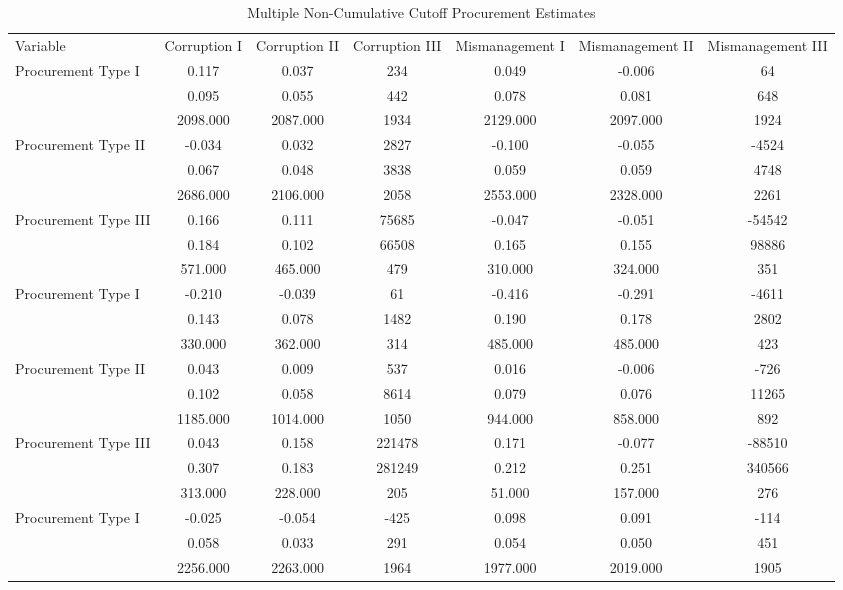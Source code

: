 \begin{table}[!htbp]
\centering
\caption{Multiple Non-Cumulative Cutoff Procurement Estimates} 
\label{tab:rdmc}
\begingroup\scriptsize
\begin{tabular}{lcccccc}
  \hline
\hline
Variable & Corruption I & Corruption II & Corruption III & Mismanagement I & Mismanagement II & Mismanagement III \\ 
 Procurement Type I & 0.117 & 0.037 & 234 & 0.049 & -0.006 & 64 \\ 
    & 0.095 & 0.055 & 442 & 0.078 & 0.081 & 648 \\ 
    & 2098.000 & 2087.000 & 1934 & 2129.000 & 2097.000 & 1924 \\ 
  Procurement Type II & -0.034 & 0.032 & 2827 & -0.100 & -0.055 & -4524 \\ 
    & 0.067 & 0.048 & 3838 & 0.059 & 0.059 & 4748 \\ 
    & 2686.000 & 2106.000 & 2058 & 2553.000 & 2328.000 & 2261 \\ 
  Procurement Type III & 0.166 & 0.111 & 75685 & -0.047 & -0.051 & -54542 \\ 
    & 0.184 & 0.102 & 66508 & 0.165 & 0.155 & 98886 \\ 
    & 571.000 & 465.000 & 479 & 310.000 & 324.000 & 351 \\ 
   \hline
Procurement Type I & -0.210 & -0.039 & 61 & -0.416 & -0.291 & -4611 \\ 
    & 0.143 & 0.078 & 1482 & 0.190 & 0.178 & 2802 \\ 
    & 330.000 & 362.000 & 314 & 485.000 & 485.000 & 423 \\ 
  Procurement Type II & 0.043 & 0.009 & 537 & 0.016 & -0.006 & -726 \\ 
    & 0.102 & 0.058 & 8614 & 0.079 & 0.076 & 11265 \\ 
    & 1185.000 & 1014.000 & 1050 & 944.000 & 858.000 & 892 \\ 
  Procurement Type III & 0.043 & 0.158 & 221478 & 0.171 & -0.077 & -88510 \\ 
    & 0.307 & 0.183 & 281249 & 0.212 & 0.251 & 340566 \\ 
    & 313.000 & 228.000 & 205 & 51.000 & 157.000 & 276 \\ 
   \hline
Procurement Type I & -0.025 & -0.054 & -425 & 0.098 & 0.091 & -114 \\ 
    & 0.058 & 0.033 & 291 & 0.054 & 0.050 & 451 \\ 
    & 2256.000 & 2263.000 & 1964 & 1977.000 & 2019.000 & 1905 \\ 

\end{tabular}
\end{table}
